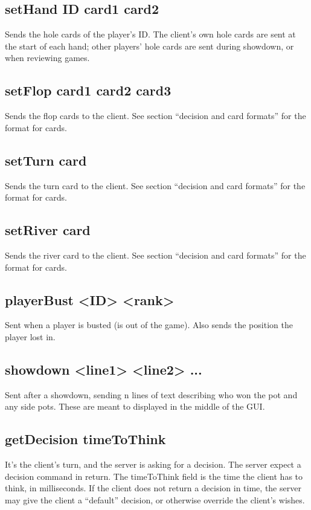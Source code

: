 \documentclass{article}
\begin{document}
\subsection*{setHand \textlangle{}ID\textrangle{} \textlangle{}card1\textrangle{} \textlangle{}card2\textrangle{}}
Sends the hole cards of the player's ID. The client's own hole cards are sent at the start of each hand; other players' hole cards are sent during showdown, or when reviewing games.

\subsection*{setFlop \textlangle{}card1\textrangle{} \textlangle{}card2\textrangle{}  \textlangle{}card3\textrangle{}}
Sends the flop cards to the client. See section ``decision and card formats'' for the format for cards.

\subsection*{setTurn \textlangle{}card\textrangle{}}
Sends the turn card to the client. See section ``decision and card formats'' for the format for cards.

\subsection*{setRiver \textlangle{}card\textrangle{}}
Sends the river card to the client. See section ``decision and card formats'' for the format for cards.

\subsection*{playerBust <ID> <rank>}
Sent when a player is busted (is out of the game). Also sends the position the player lost in.

\subsection*{showdown <line1> <line2> ... }
Sent after a showdown, sending n lines of text describing who won the pot and any side pots. These are meant to displayed in the middle of the GUI.

\subsection*{getDecision \textlangle{}timeToThink\textrangle{}}
It's the client's turn, and the server is asking for a decision. The server expect a decision command in return. The timeToThink field is the time the client has to think, in milliseconds. If the client does not return a decision in time, the server may give the client a ``default'' decision, or otherwise override the client's wishes.
\end{document}
